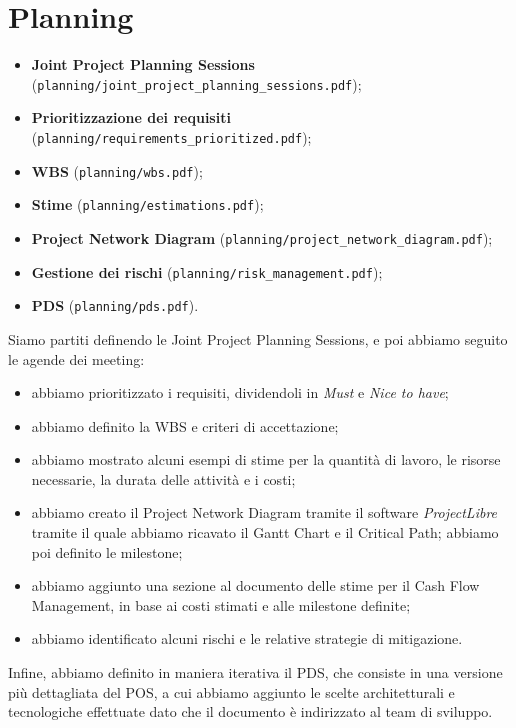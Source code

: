\documentclass[a4paper,12pt]{article}
\begin{document}
\section{Planning}
\begin{itemize}
    \item {\raggedright
        \textbf{Joint Project Planning Sessions} (\texttt{planning/joint\_project\_planning\_sessions.pdf});\par
    }
    \item \textbf{Prioritizzazione dei requisiti} (\texttt{planning/requirements\_prioritized.pdf});
    \item \textbf{WBS} (\texttt{planning/wbs.pdf});
     \item \textbf{Stime} (\texttt{planning/estimations.pdf});
    \item \textbf{Project Network Diagram} (\texttt{planning/project\_network\_diagram.pdf});
    \item \textbf{Gestione dei rischi} (\texttt{planning/risk\_management.pdf});
    \item \textbf{PDS} (\texttt{planning/pds.pdf}).
\end{itemize}
Siamo partiti definendo le Joint Project Planning Sessions, e poi abbiamo seguito le agende dei meeting:
\begin{itemize}
    \item abbiamo prioritizzato i requisiti, dividendoli in \textit{Must} e \textit{Nice to have};
    \item abbiamo definito la WBS e criteri di accettazione;
    \item abbiamo mostrato alcuni esempi di stime per la quantità di lavoro, le risorse necessarie, la durata delle
    attività e i costi;
    \item abbiamo creato il Project Network Diagram tramite il software \textit{ProjectLibre} tramite il quale abbiamo
    ricavato il Gantt Chart e il Critical Path; abbiamo poi definito le milestone;
    \item abbiamo aggiunto una sezione al documento delle stime per il Cash Flow Management, in base ai costi stimati e
    alle milestone definite;
    \item abbiamo identificato alcuni rischi e le relative strategie di mitigazione.
\end{itemize}
Infine, abbiamo definito in maniera iterativa il PDS, che consiste in una versione più dettagliata del POS, a cui
abbiamo aggiunto le scelte architetturali e tecnologiche effettuate dato che il documento è indirizzato al team di
sviluppo.
\end{document}
